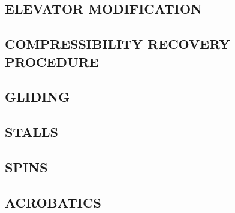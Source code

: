 \subsection{ELEVATOR MODIFICATION}
\subsection{COMPRESSIBILITY RECOVERY PROCEDURE}
\subsection{GLIDING}
\subsection{STALLS}
\subsection{SPINS}
\subsection{ACROBATICS}


\cleardoublepage